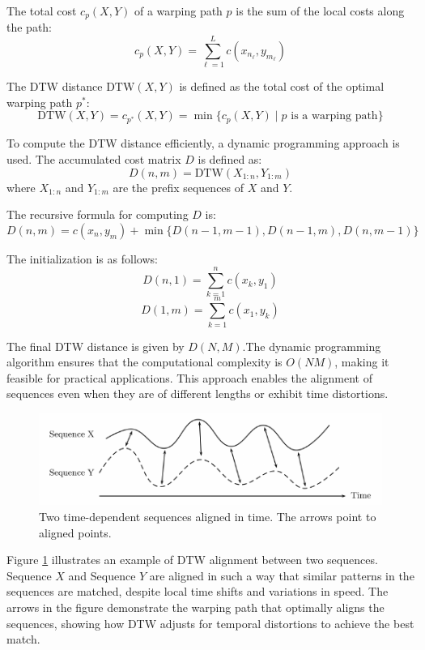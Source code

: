 The total cost \( c_p(X, Y) \) of a warping path \( p \) is the sum of the local costs along the path:
\[ c_p(X, Y) = \sum_{\ell=1}^{L} c(x_{n_\ell}, y_{m_\ell}) \]

The DTW distance \( \text{DTW}(X, Y) \) is defined as the total cost of the optimal warping path \( p^* \):
\[ \text{DTW}(X, Y) = c_{p^*}(X, Y) = \min \{ c_p(X, Y) \mid p \text{ is a warping path} \} \]

To compute the DTW distance efficiently, a dynamic programming approach is used. The accumulated cost matrix \( D \) is defined as:
\[ D(n, m) = \text{DTW}(X_{1:n}, Y_{1:m}) \]
where \( X_{1:n} \) and \( Y_{1:m} \) are the prefix sequences of \( X \) and \( Y \).

The recursive formula for computing \( D \) is:
\[ D(n, m) = c(x_n, y_m) + \min \{ D(n-1, m-1), D(n-1, m), D(n, m-1) \} \]

The initialization is as follows:
\[ D(n, 1) = \sum_{k=1}^{n} c(x_k, y_1) \]
\[ D(1, m) = \sum_{k=1}^{m} c(x_1, y_k) \]

The final DTW distance is given by \( D(N, M) \).The dynamic programming algorithm ensures that the computational complexity is \( O(NM) \), making it feasible for practical applications. This approach enables the alignment of sequences even when they are of different lengths or exhibit time distortions.

\begin{figure}[!ht]
	\centering
	\includegraphics[width=1.0\linewidth]{figures/dtw.png}
	\caption{Two time-dependent sequences aligned in time. The arrows point to aligned points.}
	\label{fig:dtw}
\end{figure}

Figure \ref{fig:dtw} illustrates an example of DTW alignment between two sequences. Sequence \( X \) and Sequence \( Y \) are aligned in such a way that similar patterns in the sequences are matched, despite local time shifts and variations in speed. The arrows in the figure demonstrate the warping path that optimally aligns the sequences, showing how DTW adjusts for temporal distortions to achieve the best match.


